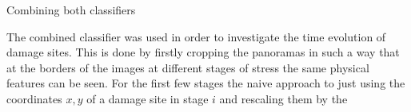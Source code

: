 Combining both classifiers


The combined classifier was used in order to investigate the time evolution of damage sites. This is done by firstly cropping the panoramas in such a way that at the borders of the images at different stages of stress the same physical features can be seen. For the first few stages the naive approach to just using the coordinates $x,y$ of a damage site in stage $i$ and rescaling them by the 


















